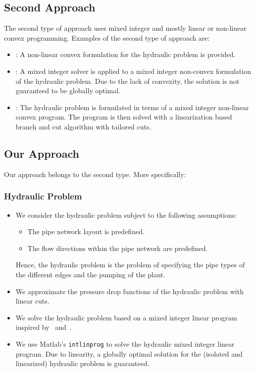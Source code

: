 \documentclass[a4paper,10pt]{article}
\begin{document}
\subsection{Second Approach}
The second type of approach uses mixed integer and mostly linear or non-linear convex programming. 
Examples of the second type of approach are:
\begin{itemize}
  \item \cite{Hendrickson}: A non-linear convex formulation for the hydraulic problem is provided.
  \item \cite{Bragalli}: A mixed integer solver is applied to a mixed integer non-convex formulation of the hydraulic problem. 
  Due to the lack of convexity, the solution is not guaranteed to be globally optimal.
  \item \cite{Raghunathan}: The hydraulic problem is formulated in terms of a mixed integer non-linear convex program. 
  The program is then solved with a linearization based branch and cut algorithm with tailored cuts.
\end{itemize}

\subsection{Our Approach}
Our approach belongs to the second type. More specifically:

\subsubsection{Hydraulic Problem}
\begin{itemize}
  \item We consider the hydraulic problem subject to the following assumptions:
  \begin{itemize}
    \item The pipe network layout is predefined.
    \item The flow directions within the pipe network are predefined. 
  \end{itemize}
  Hence, the hydraulic problem is the problem of specifying the pipe types of the different edges and the pumping of the plant.
  \item We approximate the pressure drop functions of the hydraulic problem with linear cuts.
  \item We solve the hydraulic problem based on a mixed integer linear program inspired by~\cite{Hendrickson} and~\cite{Raghunathan}. 
  \item We use Matlab's \texttt{intlinprog} to solve the hydraulic mixed integer linear program. 
  Due to linearity, a globally optimal solution for the (isolated and linearized) hydraulic problem is guaranteed.
\end{itemize}
\end{document}
